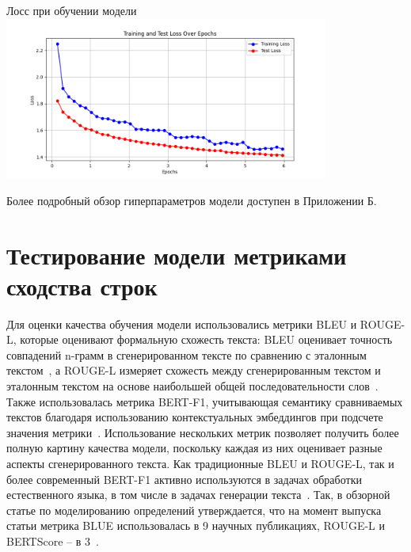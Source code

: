 \documentclass[LI,VKR]{HSEUniversity}
\begin{document}
\begin{FIGURE}[h]{Лосс при обучении модели \label{fig:loss-plot-epoch}}
\includegraphics[width=0.8\textwidth]{img/loss-plot-epoch}
\end{FIGURE}

Более подробный обзор гиперпараметров модели доступен в Приложении Б.

\section{Тестирование модели метриками сходства строк}

Для оценки качества обучения модели использовались метрики BLEU и ROUGE-L,
которые оценивают формальную схожесть текста: BLEU оценивает точность совпадений n-грамм
в сгенерированном тексте по сравнению с эталонным текстом~\cite{BLUE}, а ROUGE-L измеряет схожесть между
сгенерированным текстом и эталонным текстом на основе наибольшей общей последовательности слов~\cite{ROUGE}.
Также использовалась метрика BERT-F1, учитывающая семантику сравниваемых текстов благодаря
использованию контекстуальных эмбеддингов при подсчете значения метрики~\cite{BERTScore}.
Использование нескольких метрик позволяет получить более полную картину качества модели,
поскольку каждая из них оценивает разные аспекты сгенерированного текста.
Как традиционные BLEU и ROUGE-L, так и более современный BERT-F1 активно используются в
задачах обработки естественного языка, в том числе в задачах генерации текста~\cite{BLUE,ROUGE,BERTScore}.
Так, в обзорной статье по моделированию определений утверждается, что на момент выпуска статьи метрика BLUE
использовалась в 9 научных публикациях, ROUGE-L и BERTScore – в 3~\cite{DefinitionModelingReviewAndDatasetAnalysis}.
\end{document}

